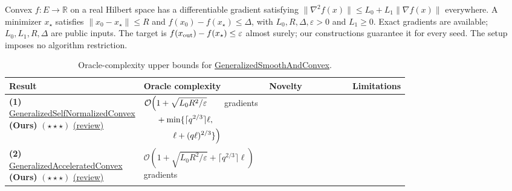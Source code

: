 \begin{table}[tp]
\centering
\caption{Oracle-complexity upper bounds for \href{https://github.com/k3nfalt/longtails/blob/main/LongTails/Setups/GeneralizedSmoothAndConvex.lean}{GeneralizedSmoothAndConvex}.}\label{tab:GeneralizedSmoothAndConvex}
\parbox{\linewidth}{\footnotesize Convex $f:E\to\mathbb R$ on a real Hilbert space has a differentiable gradient satisfying $\|\nabla^2 f(x)\|\le L_0+L_1\|\nabla f(x)\|$ everywhere. A minimizer $x_\star$ satisfies $\|x_0-x_\star\|\le R$ and $f(x_0)-f(x_\star)\le\Delta$, with $L_0,R,\Delta,\varepsilon>0$ and $L_1\ge0$. Exact gradients are available; $L_0,L_1,R,\Delta$ are public inputs. The target is $f(x_{\rm out})-f(x_\star)\le\varepsilon$ almost surely; our constructions guarantee it for every seed. The setup imposes no algorithm restriction.}\par\smallskip
\begin{threeparttable}
\footnotesize
\setlength{\tabcolsep}{4pt}\renewcommand{\arraystretch}{1.25}
\begin{tabularx}{\linewidth}{@{}>{\raggedright\arraybackslash}p{0.20\linewidth}>{\raggedright\arraybackslash}p{0.32\linewidth}>{\raggedright\arraybackslash}p{0.25\linewidth}>{\raggedright\arraybackslash}X@{}}
\toprule
\textbf{Result} & \textbf{Oracle complexity} & \textbf{Novelty} & \textbf{Limitations} \\
\midrule
\textbf{(1)} \href{https://github.com/k3nfalt/longtails/blob/main/LongTails/Theorems/GeneralizedSelfNormalizedConvex.lean}{Generalized\allowbreak Self\allowbreak Normalized\allowbreak Convex} \textbf{(Ours)} $(\star\star\star)$ \href{https://github.com/k3nfalt/longtails/blob/main/scripts/reviews/GeneralizedSelfNormalizedConvex.md}{(review)}
& $\begin{aligned}[t]\mathcal{O}\Bigl(&1+\sqrt{L_0R^2/\varepsilon}\\ &+\min\{\lceil q^{2/3}\rceil\ell,\\ &\qquad\ell+(q\ell)^{2/3}\}\Bigr)\end{aligned}$ gradients
& & \\
\midrule
\textbf{(2)} \href{https://github.com/k3nfalt/longtails/blob/main/LongTails/Theorems/GeneralizedAcceleratedConvex.lean}{Generalized\allowbreak Accelerated\allowbreak Convex} \textbf{(Ours)} $(\star\star\star)$ \href{https://github.com/k3nfalt/longtails/blob/main/scripts/reviews/GeneralizedAcceleratedConvex.md}{(review)}
& $\mathcal{O}\!\left(1+\sqrt{L_0R^2/\varepsilon}+\lceil q^{2/3}\rceil\ell\right)$ gradients
& & \\

\end{tabularx}
\end{threeparttable}
\end{table}

